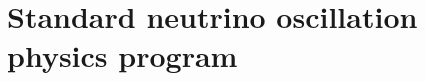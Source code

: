 \chapter{Standard neutrino oscillation physics program}
\label{ch:osc}
















%



















